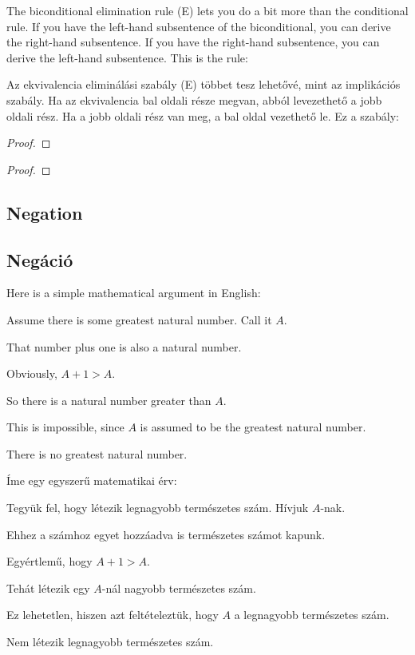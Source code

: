 The biconditional elimination rule ({\eiff}E) lets you do a bit more than the conditional rule. If you have the left-hand subsentence of the biconditional, you can derive the right-hand subsentence. If you have the right-hand subsentence, you can derive the left-hand subsentence. This is the rule:

Az ekvivalencia eliminálási szabály ({\eiff}E) többet tesz lehetővé, mint az implikációs szabály. Ha az ekvivalencia bal oldali része megvan, abból levezethető a jobb oldali rész. Ha a jobb oldali rész van meg, a bal oldal vezethető le. Ez a szabály:

\begin{multicols}{2}
\begin{proof}
	 
\end{proof}

\begin{proof}
	 
\end{proof}
\end{multicols}




\subsection*{Negation}
\subsection{Negáció}
Here is a simple mathematical argument in English:
\begin{earg}
\item[] Assume there is some greatest natural number. Call it $A$.
\item[] That number plus one is also a natural number.
\item[] Obviously, $A+1 > A$.
\item[] So there is a natural number greater than $A$.
\item[] This is impossible, since $A$ is assumed to be the greatest natural number.
\item[\therefore] There is no greatest natural number.
\end{earg}

Íme egy egyszerű matematikai érv:
\begin{earg}
\item[] Tegyük fel, hogy létezik legnagyobb természetes szám. Hívjuk $A$-nak.
\item[] Ehhez a számhoz egyet hozzáadva is természetes számot kapunk.
\item[] Egyértlemű, hogy $A+1 > A$.
\item[] Tehát létezik egy $A$-nál nagyobb természetes szám.
\item[] Ez lehetetlen, hiszen azt feltételeztük, hogy $A$ a legnagyobb természetes szám.
\item[\therefore] Nem létezik legnagyobb természetes szám.
\end{earg}

